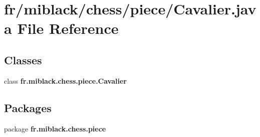 \section{fr/miblack/chess/piece/\-Cavalier.java File Reference}
\label{Cavalier_8java}
\subsection*{Classes}
\begin{DoxyCompactItemize}
\item 
class {\bf fr.\-miblack.\-chess.\-piece.\-Cavalier}
\end{DoxyCompactItemize}
\subsection*{Packages}
\begin{DoxyCompactItemize}
\item 
package {\bf fr.\-miblack.\-chess.\-piece}
\end{DoxyCompactItemize}
